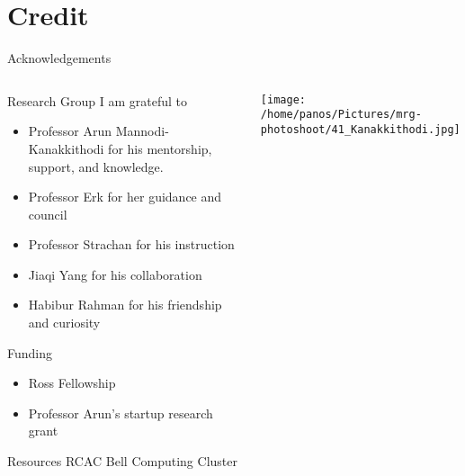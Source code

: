 \documentclass[10pt, aspectratio=169, presentation]{beamer}
\begin{document}
\section{Credit}
\label{sec:orgc86571d}
\begin{frame}[label={sec:org0875c50}]{Acknowledgements}
\begin{columns}
\begin{column}{0.6\columnwidth}
\begin{block}{Research Group}
I am grateful to
\begin{itemize}
\item Professor Arun Mannodi-Kanakkithodi for his mentorship, support, and knowledge.
\item Professor Erk for her guidance and council
\item Professor Strachan for his instruction
\item Jiaqi Yang for his collaboration
\item Habibur Rahman for his friendship and curiosity
\end{itemize}
\end{block}
\begin{block}{Funding}
\begin{itemize}
\item Ross Fellowship
\item Professor Arun's startup research grant
\end{itemize}
\end{block}
\begin{block}{Resources}
RCAC Bell Computing Cluster
\end{block}
\end{column}
\begin{column}{0.4\columnwidth}
\hspace*{-1cm}
\texttt{[image: /home/panos/Pictures/mrg-photoshoot/41\_Kanakkithodi.jpg]}
\end{column}
\end{columns}
\end{frame}
\end{document}
